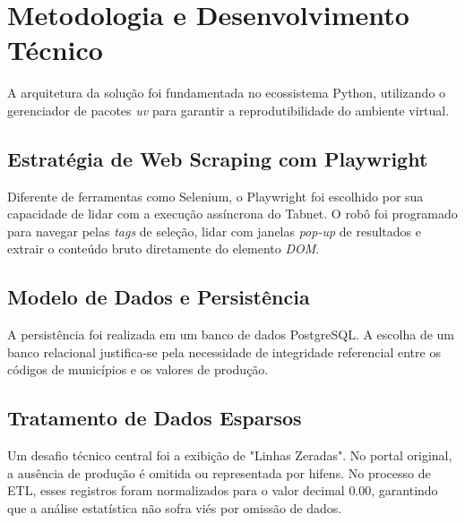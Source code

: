 ﻿\section{Metodologia e Desenvolvimento Técnico}
A arquitetura da solução foi fundamentada no ecossistema Python, utilizando o gerenciador de pacotes \textit{uv} para garantir a reprodutibilidade do ambiente virtual.

\subsection{Estratégia de Web Scraping com Playwright}
Diferente de ferramentas como Selenium, o Playwright foi escolhido por sua capacidade de lidar com a execução assíncrona do Tabnet. O robô foi programado para navegar pelas \textit{tags} de seleção, lidar com janelas \textit{pop-up} de resultados e extrair o conteúdo bruto diretamente do elemento \textit{DOM}.

\subsection{Modelo de Dados e Persistência}
A persistência foi realizada em um banco de dados PostgreSQL. A escolha de um banco relacional justifica-se pela necessidade de integridade referencial entre os códigos de municípios e os valores de produção.


\subsection{Tratamento de Dados Esparsos}
Um desafio técnico central foi a exibição de "Linhas Zeradas". No portal original, a ausência de produção é omitida ou representada por hifens. No processo de ETL, esses registros foram normalizados para o valor decimal $0.00$, garantindo que a análise estatística não sofra viés por omissão de dados.